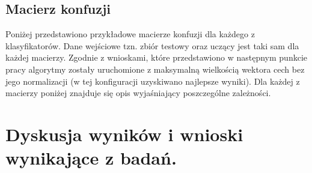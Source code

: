 \documentclass[12pt]{article}
\begin{document}
\subsection{Macierz konfuzji}
\indent Poniżej przedstawiono przykładowe macierze konfuzji dla każdego z klasyfikatorów. Dane wejściowe tzn. zbiór testowy oraz uczący jest taki sam dla każdej macierzy. Zgodnie z wnioskami, które przedstawiono w następnym punkcie pracy algorytmy zostały uruchomione z maksymalną wielkością wektora cech bez jego normalizacji (w tej konfiguracji uzyskiwano najlepsze wyniki). Dla każdej z macierzy poniżej znajduje się opis wyjaśniający poszczególne zależności.





\section{Dyskusja wyników i wnioski wynikające z badań.}
\end{document}
